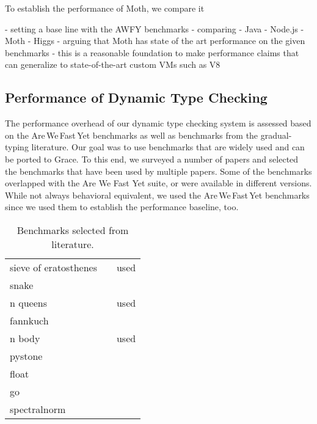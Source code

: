 To establish the performance of Moth,
we compare it 
\citep{Marr2016}

\begin{cnote}
- setting a base line with the AWFY benchmarks
- comparing
  - Java
  - Node.js
  - Moth
  - Higgs
- arguing that Moth has state of the art performance on the given benchmarks
- this is a reasonable foundation to make performance claims
  that can generalize to state-of-the-art custom VMs such as V8
\end{cnote}

\subsection{Performance of Dynamic Type Checking}

The performance overhead of our dynamic type checking system
is assessed based on the Are\,We\,Fast\,Yet benchmarks
as well as benchmarks from the gradual-typing literature.
Our goal was to use benchmarks that are widely used and can be ported to Grace.
To this end, we surveyed a number of papers\citep{Takikawa2016,Vitousek2017,Muehlboeck2017,Bauman2017,Richards2017,Stulova2016,Greenman2017}
and selected the benchmarks that have been used by multiple papers.
Some of the benchmarks overlapped with the Are We Fast Yet suite,
or were available in different versions.
While not always behavioral equivalent,
we used the Are\,We\,Fast\,Yet benchmarks since we used them to
establish the performance baseline, too.

\begin{table}
\caption{Benchmarks selected from literature.}
\label{tab:gradual-benchmarks}
\begin{tabular}{l l r}
sieve of eratosthenes &
 \cite{Takikawa2016,Muehlboeck2017,Bauman2017,Richards2017} & used \cite{Marr2016} \\
snake & \cite{Takikawa2016,Muehlboeck2017,Bauman2017,Richards2017} \\
n queens & \cite{Vitousek2017,Muehlboeck2017,Greenman2017} & used \cite{Marr2016} \\
fannkuch & \cite{Vitousek2017,Greenman2017} \\
n body & \cite{Kuhlenschmidt:2018:preprint,Vitousek2017,Greenman2017} & used \cite{Marr2016} \\
pystone & \cite{Vitousek2017,Muehlboeck2017,Greenman2017} \\
float & \cite{Vitousek2017,Muehlboeck2017,Greenman2017} \\
go & \cite{Vitousek2017,Muehlboeck2017,Greenman2017} \\
spectralnorm & \cite{Vitousek2017,Muehlboeck2017,Greenman2017}
\end{tabular}
\end{table}

